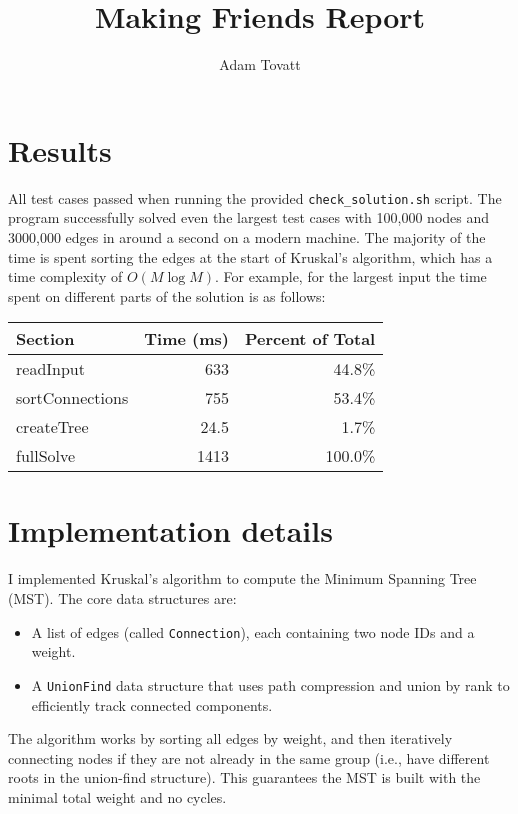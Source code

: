 \documentclass{article}
\title{Making Friends Report}
\author{Adam Tovatt}
\begin{document}
  \maketitle

  \section{Results}

  All test cases passed when running the provided \texttt{check\_solution.sh} script. The program successfully solved even the largest test cases with 100,000 nodes and 3000,000 edges in around a second on a modern machine. The majority of the time is spent sorting the edges at the start of Kruskal’s algorithm, which has a time complexity of \( O(M \log M) \). For example, for the largest input the time spent on different parts of the solution is as follows:\\

\begin{tabular}{lrr}
\textbf{Section} & \textbf{Time (ms)} & \textbf{Percent of Total} \\
\hline
readInput       & 633   & 44.8\% \\
sortConnections & 755   & 53.4\% \\
createTree      & 24.5  & 1.7\% \\
fullSolve       & 1413  & 100.0\% \\
\end{tabular}

\clearpage
\section{Implementation details}

  I implemented Kruskal’s algorithm to compute the Minimum Spanning Tree (MST). The core data structures are:

  \begin{itemize}
    \item A list of edges (called \texttt{Connection}), each containing two node IDs and a weight.
    \item A \texttt{UnionFind} data structure that uses path compression and union by rank to efficiently track connected components.
  \end{itemize}

  The algorithm works by sorting all edges by weight, and then iteratively connecting nodes if they are not already in the same group (i.e., have different roots in the union-find structure). This guarantees the MST is built with the minimal total weight and no cycles.
\end{document}

